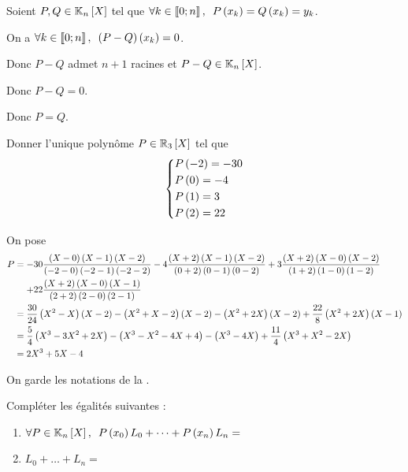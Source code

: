 \begin{dem}
\unicite

Soient \(P,Q\in\polydeg{n}\) tel que \(\quantifs{\forall k\in\interventierii{0}{n}}P\paren{x_k}=Q\paren{x_k}=y_k\).

On a \(\quantifs{\forall k\in\interventierii{0}{n}}\paren{P-Q}\paren{x_k}=0\).

Donc \(P-Q\) admet \(n+1\) racines et \(P-Q\in\polydeg{n}\).

Donc \(P-Q=0\).

Donc \(P=Q\).
\end{dem}

\begin{exo}
Donner l'unique polynôme \(P\in\polydeg[\R]{3}\) tel que \[\begin{dcases}P\left(-2\right)=-30 \\ P\left(0\right)=-4 \\ P\left(1\right)=3 \\ P\left(2\right)=22\end{dcases}\]
\end{exo}

\begin{corr}
On pose \[\begin{aligned}
P&=-30\dfrac{\paren{X-0}\paren{X-1}\paren{X-2}}{\paren{-2-0}\paren{-2-1}\paren{-2-2}}-4\dfrac{\paren{X+2}\paren{X-1}\paren{X-2}}{\paren{0+2}\paren{0-1}\paren{0-2}}+3\dfrac{\paren{X+2}\paren{X-0}\paren{X-2}}{\paren{1+2}\paren{1-0}\paren{1-2}} \\
&\color{white}=\color{black}+22\dfrac{\paren{X+2}\paren{X-0}\paren{X-1}}{\paren{2+2}\paren{2-0}\paren{2-1}} \\
&=\dfrac{30}{24}\paren{X^2-X}\paren{X-2}-\paren{X^2+X-2}\paren{X-2}-\paren{X^2+2X}\paren{X-2}+\dfrac{22}{8}\paren{X^2+2X}\paren{X-1} \\
&=\dfrac{5}{4}\paren{X^3-3X^2+2X}-\paren{X^3-X^2-4X+4}-\paren{X^3-4X}+\dfrac{11}{4}\paren{X^3+X^2-2X} \\
&=2X^3+5X-4
\end{aligned}\]
\end{corr}

\begin{exo}
On garde les notations de la .

Compléter les égalités suivantes :

\begin{enumerate}
\item \(\quantifs{\forall P\in\polydeg{n}}P\paren{x_0}L_0+\dots+P\paren{x_n}L_n=\) \\

\item \(L_0+\dots+L_n=\)
\end{enumerate}
\end{exo}

